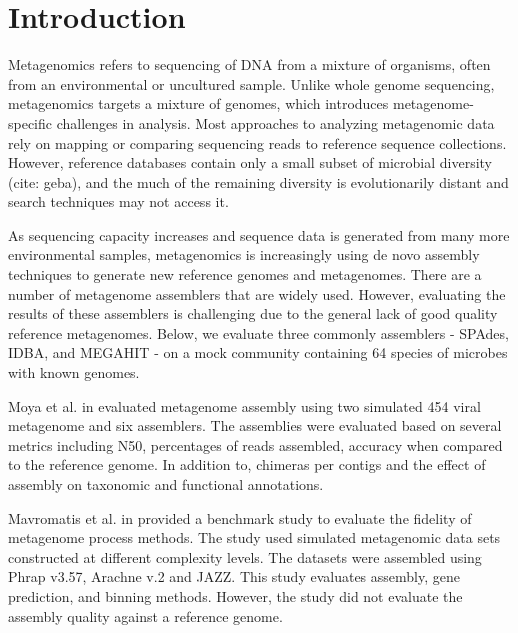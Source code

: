 \documentclass[10pt,a4paper,twocolumn]{article}
\begin{document}
\clearpage

\section*{Introduction}

Metagenomics refers to sequencing of DNA from a mixture of organisms,
often from an environmental or uncultured sample. Unlike whole genome
sequencing, metagenomics targets a mixture of genomes, which
introduces metagenome-specific challenges in analysis.  Most
approaches to analyzing metagenomic data rely on mapping or comparing
sequencing reads to reference sequence collections. However, reference
databases contain only a small subset of microbial diversity (cite:
geba), and the much of the remaining diversity is evolutionarily distant
and search techniques may not access it.

As sequencing capacity increases and sequence data is generated from
many more environmental samples, metagenomics is increasingly using de
novo assembly techniques to generate new reference genomes and
metagenomes.  There are a number of metagenome assemblers that are
widely used. However, evaluating the results of these assemblers is
challenging due to the general lack of good quality reference
metagenomes.  Below, we evaluate three commonly assemblers - SPAdes,
IDBA, and MEGAHIT - on a mock community containing 64 species of
microbes with known genomes.


 

 
Moya et al. in \cite{moya2014} evaluated metagenome assembly using
two simulated 454 viral metagenome and six assemblers. The assemblies
were evaluated based on several metrics including N50, percentages of
reads assembled, accuracy when compared to the reference genome. In
addition to, chimeras per contigs and the effect of assembly on
taxonomic and functional annotations.
 
Mavromatis et al. in \cite{mavromatis2007} provided a benchmark study
to evaluate the fidelity of metagenome process methods. The study used
simulated metagenomic data sets constructed at different complexity
levels.
The datasets were assembled using Phrap v3.57, Arachne v.2
\cite{arachne} and JAZZ. \cite{jazz}
This study evaluates assembly, gene prediction, and binning
methods. However, the study did not evaluate the assembly quality
against a reference genome.
\end{document}
